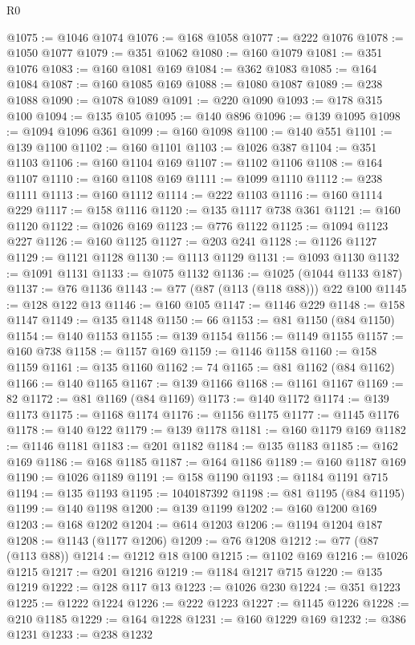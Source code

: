 \begin{lexlean}{R0}
\begin{coremodule}
@1075 := @1046 @1074
@1076 := @168 @1058
@1077 := @222 @1076
@1078 := @1050 @1077
@1079 := @351 @1062
@1080 := @160 @1079
@1081 := @351 @1076
@1083 := @160 @1081 @169
@1084 := @362 @1083
@1085 := @164 @1084
@1087 := @160 @1085 @169
@1088 := @1080 @1087
@1089 := @238 @1088
@1090 := @1078 @1089
@1091 := @220 @1090
@1093 := @178 @315 @100
@1094 := @135 @105
@1095 := @140 @896
@1096 := @139 @1095
@1098 := @1094 @1096 @361
@1099 := @160 @1098
@1100 := @140 @551
@1101 := @139 @1100
@1102 := @160 @1101
@1103 := @1026 @387
@1104 := @351 @1103
@1106 := @160 @1104 @169
@1107 := @1102 @1106
@1108 := @164 @1107
@1110 := @160 @1108 @169
@1111 := @1099 @1110
@1112 := @238 @1111
@1113 := @160 @1112
@1114 := @222 @1103
@1116 := @160 @1114 @229
@1117 := @158 @1116
@1120 := @135 @1117 @738 @361
@1121 := @160 @1120
@1122 := @1026 @169
@1123 := @776 @1122
@1125 := @1094 @1123 @227
@1126 := @160 @1125
@1127 := @203 @241
@1128 := @1126 @1127
@1129 := @1121 @1128
@1130 := @1113 @1129
@1131 := @1093 @1130
@1132 := @1091 @1131
@1133 := @1075 @1132
@1136 := @1025 (@1044 @1133 @187)
@1137 := @76 @1136
@1143 := @77 (@87 (@113 (@118 @88))) @22 @100
@1145 := @128 @122 @13
@1146 := @160 @105
@1147 := @1146 @229
@1148 := @158 @1147
@1149 := @135 @1148
@1150 := 66
@1153 := @81 @1150 (@84 @1150)
@1154 := @140 @1153
@1155 := @139 @1154
@1156 := @1149 @1155
@1157 := @160 @738
@1158 := @1157 @169
@1159 := @1146 @1158
@1160 := @158 @1159
@1161 := @135 @1160
@1162 := 74
@1165 := @81 @1162 (@84 @1162)
@1166 := @140 @1165
@1167 := @139 @1166
@1168 := @1161 @1167
@1169 := 82
@1172 := @81 @1169 (@84 @1169)
@1173 := @140 @1172
@1174 := @139 @1173
@1175 := @1168 @1174
@1176 := @1156 @1175
@1177 := @1145 @1176
@1178 := @140 @122
@1179 := @139 @1178
@1181 := @160 @1179 @169
@1182 := @1146 @1181
@1183 := @201 @1182
@1184 := @135 @1183
@1185 := @162 @169
@1186 := @168 @1185
@1187 := @164 @1186
@1189 := @160 @1187 @169
@1190 := @1026 @1189
@1191 := @158 @1190
@1193 := @1184 @1191 @715
@1194 := @135 @1193
@1195 := 1040187392
@1198 := @81 @1195 (@84 @1195)
@1199 := @140 @1198
@1200 := @139 @1199
@1202 := @160 @1200 @169
@1203 := @168 @1202
@1204 := @614 @1203
@1206 := @1194 @1204 @187
@1208 := @1143 (@1177 @1206)
@1209 := @76 @1208
@1212 := @77 (@87 (@113 @88))
@1214 := @1212 @18 @100
@1215 := @1102 @169
@1216 := @1026 @1215
@1217 := @201 @1216
@1219 := @1184 @1217 @715
@1220 := @135 @1219
@1222 := @128 @117 @13
@1223 := @1026 @230
@1224 := @351 @1223
@1225 := @1222 @1224
@1226 := @222 @1223
@1227 := @1145 @1226
@1228 := @210 @1185
@1229 := @164 @1228
@1231 := @160 @1229 @169
@1232 := @386 @1231
@1233 := @238 @1232

\end{coremodule}
\end{lexlean}
